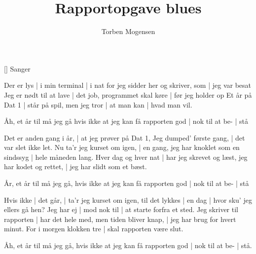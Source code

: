\documentclass[a4paper,11pt]{article}
\title{Rapportopgave blues}
\author{Torben Mogensen}
\begin{document}
\maketitle

\begin{roles}
[] Sanger
\end{roles}

\begin{song}
Der er lys | i min terminal | i nat
for jeg sidder her og skriver, som | jeg var besat
Jeg er nødt til at lave | det job,
programmet skal køre | før jeg holder op
Et år på Dat 1 | står på spil,
men jeg tror | at man kan | hvad man vil.

Åh, et år til må jeg gå
hvis ikke at jeg kan få
rapporten god | nok til at be- | stå

Det er anden gang i år, | at jeg prøver på Dat 1,
Jeg dumped' første gang, | det var slet ikke let.
Nu ta'r jeg kurset om igen, | en gang,
jeg har knoklet som en sindssyg | hele måneden lang.
Hver dag og hver nat | har jeg skrevet og læst,
jeg har kodet og rettet, | jeg har slidt som et bæst.

År, et år til må jeg gå,
hvis ikke at jeg kan få
rapporten god | nok til at be- | stå

Hvis ikke | det går, | ta'r jeg kurset om igen,
til det lykkes | en dag | hvor sku' jeg ellers gå hen?
Jeg har ej | mod nok til | at starte forfra et sted.
Jeg skriver til rapporten | har det hele med,
men tiden bliver knap, | jeg har brug for hvert minut.
For i morgen klokken tre | skal rapporten være slut.

Åh, et år til må jeg gå,
hvis ikke at jeg kan få
rapporten god | nok til at be- | stå.
\end{song}
\end{document}
